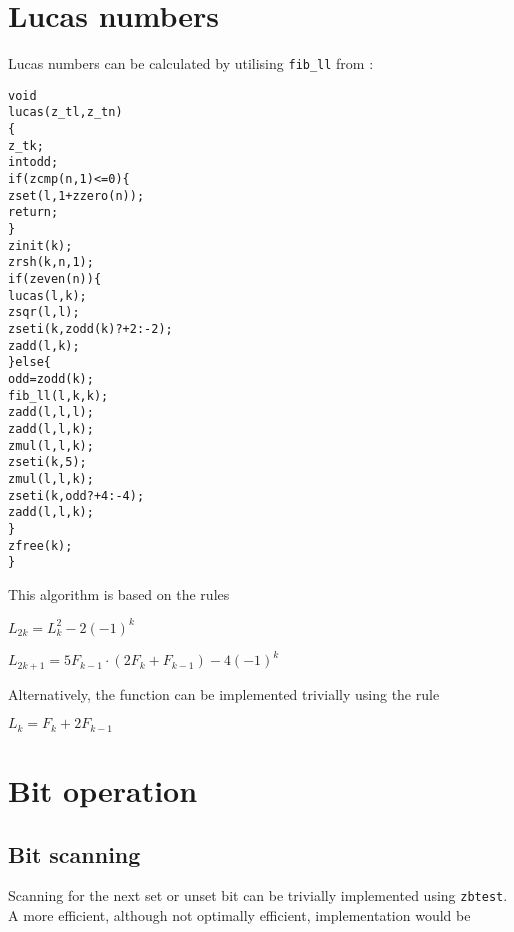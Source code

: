 \newpage
\section{Lucas numbers}
\label{sec:Lucas numbers}

Lucas numbers can be calculated by utilising
{\tt fib\_ll} from :

\begin{alltt}
   void
   lucas(z_t l, z_t n)
   \{
       z_t k;
       int odd;
       if (zcmp(n, 1) <= 0) \{
           zset(l, 1 + zzero(n));
           return;
       \}
       zinit(k);
       zrsh(k, n, 1);
       if (zeven(n)) \{
           lucas(l, k);
           zsqr(l, l);
           zseti(k, zodd(k) ? +2 : -2);
           zadd(l, k);
       \} else \{
           odd = zodd(k);
           fib_ll(l, k, k);
           zadd(l, l, l);
           zadd(l, l, k);
           zmul(l, l, k);
           zseti(k, 5);
           zmul(l, l, k);
           zseti(k, odd ? +4 : -4);
           zadd(l, l, k);
       \}
       zfree(k);
   \}
\end{alltt}

\noindent
This algorithm is based on the rules

\vspace{1em}
\( \displaystyle{
    L_{2k} = L_k^2 - 2(-1)^k
}\)
\vspace{1ex}

\( \displaystyle{
    L_{2k + 1} = 5F_{k - 1} \cdot (2F_k + F_{k - 1}) - 4(-1)^k
}\)
\vspace{1em}

\noindent
Alternatively, the function can be implemented
trivially using the rule

\vspace{1em}
\( \displaystyle{
    L_k = F_k + 2F_{k - 1}
}\)


\newpage
\section{Bit operation}
\label{sec:Bit operation unimplemented}

\subsection{Bit scanning}
\label{sec:Bit scanning}

Scanning for the next set or unset bit can be
trivially implemented using {\tt zbtest}. A
more efficient, although not optimally efficient,
implementation would be

